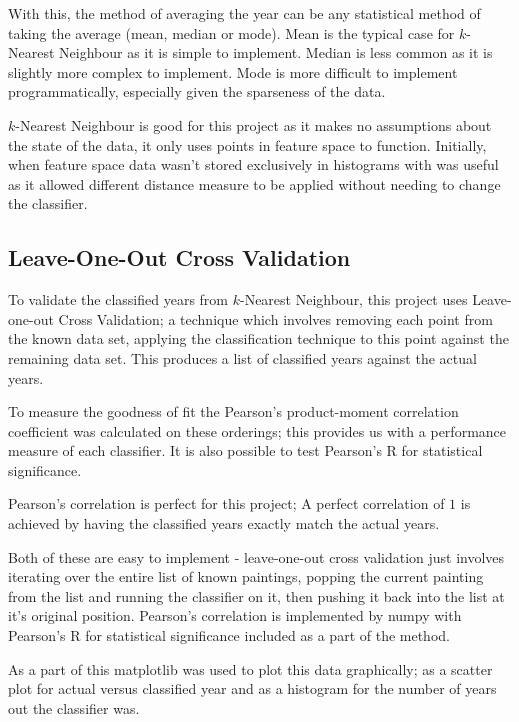 With this, the method of averaging the year can be any statistical method of taking the average
(mean, median or mode). Mean is the typical case for $k$-Nearest Neighbour as it is simple to
implement. Median is less common as it is slightly more complex to implement. Mode is more 
difficult to implement programmatically, especially given the sparseness of the data. 

$k$-Nearest Neighbour is good for this project as it makes no assumptions about the state of the
data, it only uses points in feature space to function. Initially, when feature space data wasn't
stored exclusively in histograms with was useful as it allowed different distance measure to be
applied without needing to change the classifier.


\subsection{Leave-One-Out Cross Validation}
To validate the classified years from $k$-Nearest Neighbour, this project uses Leave-one-out Cross
Validation; a technique which involves removing each point from the known data set, applying the
classification technique to this point against the remaining data set. This produces a list of
classified years against the actual years.

To measure the goodness of fit the Pearson's product-moment correlation coefficient was 
calculated on these orderings; this provides us with a performance measure of each classifier. 
It is also possible to test Pearson's R for statistical significance.

Pearson's correlation is perfect for this project; A perfect correlation of $1$ is achieved by
having the classified years exactly match the actual years.

Both of these are easy to implement - leave-one-out cross validation just involves iterating over
the entire list of known paintings, popping the current painting from the list and running the 
classifier on it, then pushing it back into the list at it's original position. Pearson's 
correlation is implemented by numpy with Pearson's R for statistical significance included
as a part of the method.

As a part of this matplotlib was used to plot this data graphically; as a scatter plot for
actual versus classified year and as a histogram for the number of years out the classifier was.



